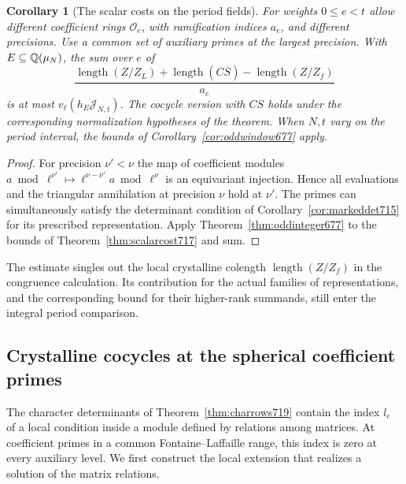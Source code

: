 \documentclass[a4paper,11pt]{article}
\newtheorem{corollary}[proposition]{Corollary}
\theoremstyle{definition}
\theoremstyle{remark}
\newcommand{\len}{\operatorname{length}}\newcommand{\Res}{\operatorname*{Res}}
\numberwithin{equation}{section}
\begin{document}
\begin{corollary}[The scalar costs on the period fields]
\leavevmode\label{cor:scalarsum717}
For weights \(0\le e<t\) allow different coefficient rings
\(\mathcal O_e\), with ramification indices \(a_e\), and
different precisions. Use a common set of auxiliary primes
at the largest precision. With \(E\subseteq\mathbb Q(\mu_N)\),
the sum over \(e\) of
\[
 \frac{\len(Z/Z_L)+\len(C\overline S)-\len(Z/Z_f)}{a_e}
\]
is at most \(v_\ell(h_E\mathcal J_{N,t})\).
The cocycle version with \(CS\) holds under the corresponding
normalization hypotheses of the theorem. When \(N,t\) vary on
the period interval, the bounds of
Corollary~\ref{cor:oddwindow677} apply.
\end{corollary}
\begin{proof}
For precision \(\nu'<\nu\) the map of coefficient modules
\(a\bmod\ell^{\nu'}\mapsto\ell^{\nu-\nu'}a\bmod\ell^\nu\)
is an equivariant injection. Hence all evaluations and the
triangular annihilation at precision \(\nu\) hold at
\(\nu'\). The primes can simultaneously satisfy the determinant
condition of Corollary~\ref{cor:markeddet715} for its prescribed
representation. Apply Theorem~\ref{thm:oddinteger677} to
the bounds of Theorem~\ref{thm:scalarcost717} and sum.
\end{proof}

The estimate singles out the local crystalline colength
\(\len(Z/Z_f)\) in the congruence calculation. Its contribution
for the actual families of representations, and the corresponding
bound for their higher-rank summands, still enter the integral
period comparison.
\clearpage

\subsection{Crystalline cocycles at the spherical coefficient primes}
\label{sec:flrelations724}

The character determinants of Theorem~\ref{thm:charrows719} contain
the index \(l_e\) of a local condition inside a module defined by relations
among matrices. At coefficient primes in a common Fontaine--Laffaille
range, this index is zero at every auxiliary level. We first construct
the local extension that realizes a solution of the matrix relations.
\end{document}
